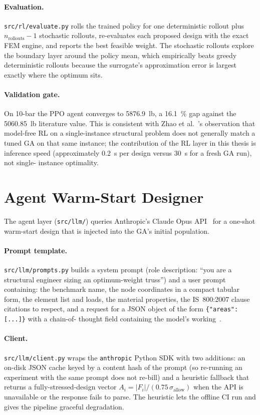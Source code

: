\paragraph{Evaluation.} \texttt{src/rl/evaluate.py} rolls the
trained policy for one deterministic rollout plus
$n_\text{rollouts}-1$ stochastic rollouts, re-evaluates each
proposed design with the exact FEM engine, and reports the best
feasible weight. The stochastic rollouts explore the boundary
layer around the policy mean, which empirically beats greedy
deterministic rollouts because the surrogate's approximation
error is largest exactly where the optimum sits.

\paragraph{Validation gate.} On 10-bar the PPO agent converges to
\num{5876.9}~lb, a \num{16.1}~\% gap against the
\num{5060.85}~lb literature value. This is consistent with
Zhao et al.~\cite{zhao2021rl}'s observation that model-free RL on a
single-instance structural problem does not generally match a
tuned GA on that same instance; the contribution of the RL layer
in this thesis is inference speed (approximately \num{0.2}~s per
design versus \num{30}~s for a fresh GA run), not single-
instance optimality.

\section{Agent Warm-Start Designer}
\label{sec:method:llm}

The agent layer (\texttt{src/llm/}) queries Anthropic's Claude Opus
API~\cite{anthropic-docs} for a one-shot warm-start design that is
injected into the GA's initial population.

\paragraph{Prompt template.} \texttt{src/llm/prompts.py} builds a
system prompt (role description: ``you are a structural engineer
sizing an optimum-weight truss'') and a user prompt containing:
the benchmark name, the node coordinates in a compact tabular
form, the element list and loads, the material properties, the
IS~800:2007 clause citations to respect, and a request for a JSON
object of the form \texttt{\{"areas": [...]\}} with a chain-of-
thought field containing the model's working~\cite{wei2022cot}.

\paragraph{Client.} \texttt{src/llm/client.py} wraps the
\texttt{anthropic} Python SDK with two additions: an on-disk JSON
cache keyed by a content hash of the prompt (so re-running an
experiment with the same prompt does not re-bill) and a heuristic
fallback that returns a fully-stressed-design vector
$A_i = |F_i| / (\num{0.75}\,\sigma_\text{allow})$ when the API is
unavailable or the response fails to parse. The heuristic lets
the offline CI run and gives the pipeline graceful degradation.


